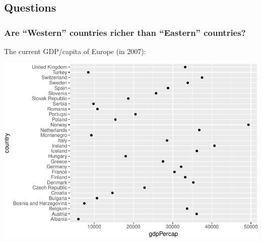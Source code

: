 \documentclass[11pt,]{article}
\newenvironment{Shaded}{\begin{snugshade}}{\end{snugshade}}
\newcommand{\KeywordTok}[1]{\textcolor[rgb]{0.13,0.29,0.53}{\textbf{#1}}}
\newcommand{\DataTypeTok}[1]{\textcolor[rgb]{0.13,0.29,0.53}{#1}}
\newcommand{\DecValTok}[1]{\textcolor[rgb]{0.00,0.00,0.81}{#1}}
\newcommand{\StringTok}[1]{\textcolor[rgb]{0.31,0.60,0.02}{#1}}
\newcommand{\CommentTok}[1]{\textcolor[rgb]{0.56,0.35,0.01}{\textit{#1}}}
\newcommand{\OperatorTok}[1]{\textcolor[rgb]{0.81,0.36,0.00}{\textbf{#1}}}
\newcommand{\NormalTok}[1]{#1}
\begin{document}
\subsection{Questions}\label{questions}

\subsubsection{\texorpdfstring{Are ``Western'' countries richer than
``Eastern''
countries?}{Are Western countries richer than Eastern countries?}}\label{are-western-countries-richer-than-eastern-countries}

The current GDP/capita of Europe (in 2007):

\begin{Shaded}
\end{Shaded}

\includegraphics{Intro_graphics_files/figure-latex/plot_eur-1.pdf}
\end{document}
